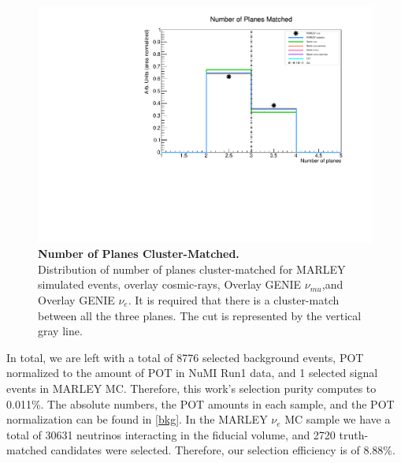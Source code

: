 \begin{figure}[h!]
    \centering
    \includegraphics[width=120mm]{Figures/blip_n_planes.pdf}
    \caption[Number of Planes Cluster-Matched.]{{\textbf{Number of Planes Cluster-Matched.}}\\ Distribution of number of planes cluster-matched for MARLEY simulated events, overlay cosmic-rays, Overlay GENIE $\nu_{mu}$,and Overlay GENIE $\nu_{e}$. It is required that there is a cluster-match between all the three planes. The cut is represented by the vertical gray line.}
    \label{blip_nplanes}
\end{figure}

In total, we are left with a total of 8776 selected background events, POT normalized to the amount of POT in NuMI Run1 data, and 1 selected signal events in MARLEY MC. Therefore, this work's selection purity computes to 0.011\%. The absolute numbers, the POT amounts in each sample, and the POT normalization can be found in \ref{bkg}. In the MARLEY $\nu_{e}$ MC sample we have a total of 30631 neutrinos interacting in the fiducial volume, and 2720 truth-matched candidates were selected. Therefore, our selection efficiency is of 8.88\%.

